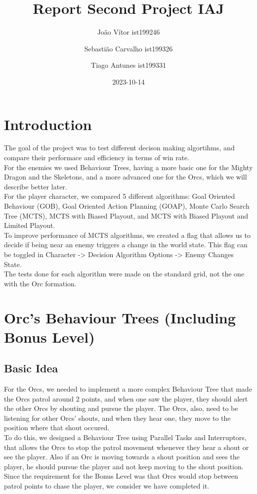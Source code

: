 \documentclass{article}
\title{Report Second Project IAJ}
\author{João Vítor ist199246
  \and Sebastião Carvalho ist199326
  \and Tiago Antunes ist199331}
\date{2023-10-14}
\begin{document}
  \maketitle
  \tableofcontents
  \newpage
  \section{Introduction}
  The goal of the project was to test different decison making algortihms, and compare their performace and efficiency in terms of win rate. \\
  For the enemies we used Behaviour Trees, having a more basic one for the Mighty Dragon and the Skeletons, and a more advanced one for the Orcs, 
  which we will describe better later.\\
  For the player character, we compared 5 different algorithms: Goal Oriented Behaviour (GOB), Goal Oriented Action Planning (GOAP), Monte Carlo Search Tree (MCTS),
  MCTS with Biased Playout, and MCTS with Biased Playout and Limited Playout.\\
  To improve performance of MCTS algorithms, we created a flag that allows us to decide if being near an enemy triggers a change in the world state. 
  This flag can be toggled in Character -> Decision Algorithm Options -> Enemy Changes State. \\
  The tests done for each algorithm were made on the standard grid, not the one with the Orc formation.
  \section{Orc's Behaviour Trees (Including Bonus Level)}
  \subsection{Basic Idea}
  For the Orcs, we needed to implement a more complex Behaviour Tree that made the Orcs patrol around 2 points, and when one saw the player, they should alert the other Orcs
  by shouting and pursue the player. The Orcs, also, need to be listening for other Orcs' shouts, and when they hear one, they move to the position where that shout occured. \\
  To do this, we designed a Behaviour Tree using Parallel Tasks and Interruptors, that allows the Orcs to stop the patrol movement whenever they hear a shout or 
  see the player. Also if an Orc is moving towards a shout position and sees the player, he should pursue the player and not keep moving to the shout position.\\
  Since the requirement for the Bonus Level was that Orcs would stop between patrol points to chase the player, we consider we have completed it.
\end{document}
